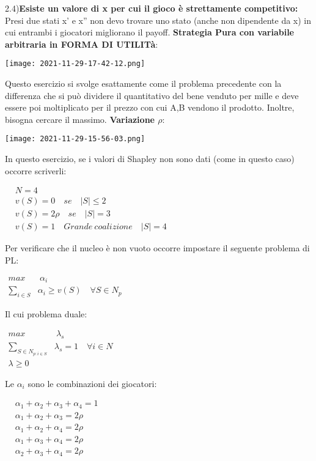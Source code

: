 \documentclass{article}
\theoremstyle{definition}
\theoremstyle{remark}
\begin{document}
2.4)\textbf{Esiste un valore di x per cui il gioco è strettamente competitivo:} Presi due stati x' e x'' non devo trovare uno stato (anche non dipendente da x) in cui entrambi i giocatori migliorano il payoff.\newline
\textbf{Strategia Pura con variabile arbitraria in FORMA DI UTILITà}:
\begin{center}
    \texttt{[image: 2021-11-29-17-42-12.png]}
\end{center}
Questo esercizio si svolge esattamente come il problema precedente con la differenza che si può dividere il quantitativo del bene venduto per mille e deve essere poi moltiplicato
per il prezzo con cui A,B vendono il prodotto. Inoltre, bisogna cercare il massimo.\newline
\textbf{Variazione \(\rho\)}:
\begin{center}
    \texttt{[image: 2021-11-29-15-56-03.png]}
\end{center}
In questo esercizio, se i valori di Shapley non sono dati (come in questo caso) occorre scriverli:
\begin{center}
    $\begin{aligned}
        & N=4 \\
        & v(S)=0\quad se\quad |S|\leq 2 \\
        & v(S)=2\rho\quad se\quad |S|=3 \\
        & v(S)=1\quad Grande\ coalizione\quad |S|=4
    \end{aligned}$
\end{center}
Per verificare che il nucleo è non vuoto occorre impostare il seguente problema di PL:
\begin{center}
    $\begin{aligned}
        max &\ \alpha_i\\
        \sum_{i\in S}& \alpha_i\geq v(S)\quad \forall S\in N_p
    \end{aligned}$
\end{center}
Il cui problema duale:
\begin{center}
    $\begin{aligned}
        max &\ \lambda_s\\
        \sum_{S\in N_{p:i\in S}}& \lambda_s= 1\quad \forall i\in N\\
        \lambda\geq 0
    \end{aligned}$
\end{center}
Le \(\alpha_i\) sono le combinazioni dei giocatori:
\begin{center}
    $\begin{aligned}
        & \alpha_1+\alpha_2+\alpha_3+\alpha_4=1\\
        & \alpha_1 +\alpha_2+\alpha_3=2\rho\\
        & \alpha_1 +\alpha_2+\alpha_4=2\rho\\
        & \alpha_1 +\alpha_3+\alpha_4=2\rho\\
        & \alpha_2 +\alpha_3+\alpha_4=2\rho\\
    \end{aligned}$
\end{center}
\end{document}
